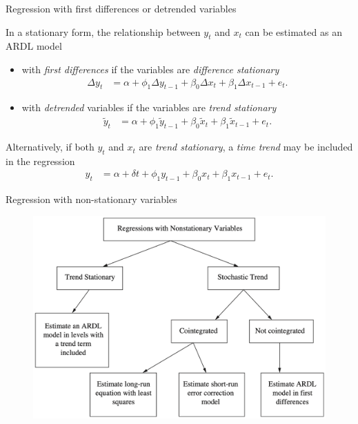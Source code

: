 \documentclass[10pt,aspectratio=169]{beamer}  %
\begin{document}
\begin{frame}{Regression with first differences or detrended variables}

    \bigskip
    In a stationary form, the relationship between $ y_{t} $ and $ x_{t} $ can be estimated as an ARDL model
    \begin{itemize}
        \item with \textit{first differences} if the variables are \textit{difference stationary}
        \begin{align*}
            \Delta y_{t} & = \alpha + \phi_1 \Delta y_{t-1} + \beta_0 \Delta x_{t} + \beta_1 \Delta x_{t-1} + e_{t}.
        \end{align*}
        \item with \textit{detrended} variables if the variables are \textit{trend stationary}
        \begin{align*}
            \widetilde{y}_{t} & = \alpha + \phi_1 \widetilde{y}_{t-1} + \beta_0 \widetilde{x}_{t} + \beta_1 \widetilde{x}_{t-1} + e_{t}.
        \end{align*}
    \end{itemize}

    \medskip
    Alternatively, if both $ y_{t} $ and $ x_{t} $ are \textit{trend stationary}, a \textit{time trend} may be included in the regression
    \begin{align*}
        y_{t} & = \alpha + \delta t + \phi_1 y_{t-1} + \beta_0 x_{t} + \beta_1 x_{t-1} + e_{t}.
    \end{align*}

\end{frame}


\begin{frame}{Regression with non-stationary variables}

    \bigskip
    \begin{figure}[H]
        \centering
        \includegraphics[height=0.5\textwidth]{./fig/regression-with-non-stationary-variables.png}
    \end{figure}

\end{frame}
\end{document}
